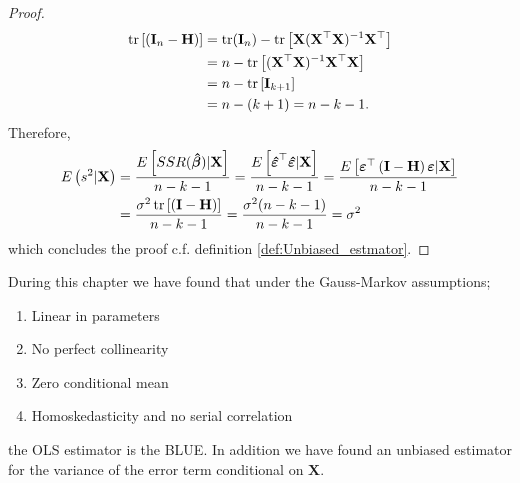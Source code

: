 \begin{proof}
    \begin{align*}
        \operatorname{\text{tr}}\left[\left(\mathbf{I}_n - \mathbf{H}\right)\right] &= \operatorname{\text{tr}}(\mathbf{I}_n) - \operatorname{\text{tr}}\left[\mathbf{X}(\mathbf{X}^\top\mathbf{X})^{-1}\mathbf{X}^\top\right] \\
        &= n - \operatorname{\text{tr}}\left[ (\mathbf{X}^\top\mathbf{X})^{-1}\mathbf{X}^\top\mathbf{X} \right] \\
         &= n - \operatorname{\text{tr}}\left[\mathbf{I}_{k + 1} \right] \\
        &= n - (k + 1) = n - k - 1.
    \end{align*}
    Therefore,
    \begin{align*}
        E\left(s^2|\mathbf{X}\right) &= \frac{E\left[SSR(\operatorname{\boldsymbol{\hat{\beta}}})|\textbf{X}\right]}{n - k - 1} = \frac{E\left[\boldsymbol{\hat{\varepsilon}}^\top\boldsymbol{\hat{\varepsilon}}|\textbf{X}\right]}{n - k - 1}= \frac{ E\left[\boldsymbol{\varepsilon}^\top \left(\mathbf{I} - \mathbf{H}\right)\boldsymbol{\varepsilon}|\mathbf{X}\right]}{n - k - 1} \\ &= \frac{\sigma^2\operatorname{\text{tr}}\left[\left(\mathbf{I} - \mathbf{H}\right)\right]}{n - k - 1} = \frac{\sigma^2(n - k - 1)}{n - k - 1} = \sigma^2
    \end{align*}
    which concludes the proof c.f. definition \ref{def:Unbiased_estmator}.
\end{proof}
During this chapter we have found that under the Gauss-Markov assumptions;
\begin{enumerate}
    \item Linear in parameters
    \item No perfect collinearity
    \item Zero conditional mean
    \item Homoskedasticity and no serial correlation
\end{enumerate}
 the OLS estimator is the BLUE. 
 In addition we have found an unbiased estimator for the variance of the error term conditional on $\textbf{X}$.